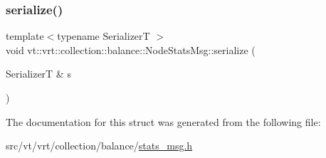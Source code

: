 \subsubsection{\texorpdfstring{serialize()}{serialize()}}
{\footnotesize\ttfamily template$<$typename SerializerT $>$ \\
void vt\+::vrt\+::collection\+::balance\+::\+Node\+Stats\+Msg\+::serialize (\begin{DoxyParamCaption}\item[{SerializerT \&}]{s }\end{DoxyParamCaption})\hspace{0.3cm}{\ttfamily [inline]}}



The documentation for this struct was generated from the following file\+:\begin{DoxyCompactItemize}
\item 
src/vt/vrt/collection/balance/\hyperlink{stats__msg_8h}{stats\+\_\+msg.\+h}\end{DoxyCompactItemize}
